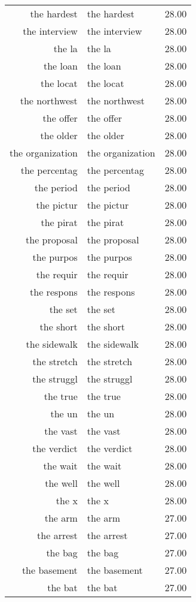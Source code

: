 \begin{table}[ht]
\begin{tabular}{rlr}
  the hardest & the hardest & 28.00 \\ 
  the interview & the interview & 28.00 \\ 
  the la & the la & 28.00 \\ 
  the loan & the loan & 28.00 \\ 
  the locat & the locat & 28.00 \\ 
  the northwest & the northwest & 28.00 \\ 
  the offer & the offer & 28.00 \\ 
  the older & the older & 28.00 \\ 
  the organization & the organization & 28.00 \\ 
  the percentag & the percentag & 28.00 \\ 
  the period & the period & 28.00 \\ 
  the pictur & the pictur & 28.00 \\ 
  the pirat & the pirat & 28.00 \\ 
  the proposal & the proposal & 28.00 \\ 
  the purpos & the purpos & 28.00 \\ 
  the requir & the requir & 28.00 \\ 
  the respons & the respons & 28.00 \\ 
  the set & the set & 28.00 \\ 
  the short & the short & 28.00 \\ 
  the sidewalk & the sidewalk & 28.00 \\ 
  the stretch & the stretch & 28.00 \\ 
  the struggl & the struggl & 28.00 \\ 
  the true & the true & 28.00 \\ 
  the un & the un & 28.00 \\ 
  the vast & the vast & 28.00 \\ 
  the verdict & the verdict & 28.00 \\ 
  the wait & the wait & 28.00 \\ 
  the well & the well & 28.00 \\ 
  the x & the x & 28.00 \\ 
  the arm & the arm & 27.00 \\ 
  the arrest & the arrest & 27.00 \\ 
  the bag & the bag & 27.00 \\ 
  the basement & the basement & 27.00 \\ 
  the bat & the bat & 27.00 \\ 

\end{tabular}
\end{table}
